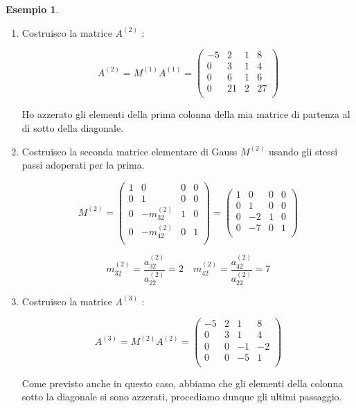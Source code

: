 \documentclass[12pt, a4paper]{book}
\theoremstyle{definition}
\newtheorem{exmp}{Esempio}[section]
\begin{document}
\begin{flushleft}
\begin{exmp}
\begin{enumerate}
	 \item Costruisco la matrice $A^{(2)}$ :
 
 	\[
 		A^{(2)} =  M^{(1)}A^{(1)} = 
 			\begin{pmatrix}
				-5 & 2 & 1 & 8 \\
				0 & 3 & 1 & 4 \\
				0 & 6 & 1 & 6 \\
				0 & 21 & 2 & 27 \\
			\end{pmatrix}
 	\]
 
 
 	Ho azzerato gli elementi della prima colonna della mia matrice di partenza al di sotto della diagonale.
 	
 	\item Costruisco la seconda matrice elementare di Gauss $M^{(2)}$ usando gli stessi passi adoperati per la prima.
 	
 	\[ 
 			M^{(2)} = 
				\begin{pmatrix}
					1 & 0 & 0 & 0 \\
					0 & 1 & 0 &0 \\
					0& -m^{(2)}_{32} & 1 & 0\\
					0 & -m^{(2)}_{42} & 0 & 1 \\
				\end{pmatrix}
				=
				\begin{pmatrix}
					1 & 0 & 0 & 0 \\
					0 & 1 & 0 &0 \\
					0& -2 & 1 & 0\\
					0 & -7 & 0 & 1 \\
				\end{pmatrix}
 	\]
 	
    \[ m^{(2)}_{32} = \frac{a^{(2)}_{32}}{a^{(2)}_{22}} = 2 \quad m^{(2)}_{42} = \frac{a^{(2)}_{42}}{a^{(2)}_{22}} = 7 \]
 	
 	\newpage
 	
 	\item Costruisco la matrice $A^{(3)}$ :
 	 
 	 	\[
 			A^{(3)} =  M^{(2)}A^{(2)} = 
 				\begin{pmatrix}
					-5 & 2 & 1 & 8 \\
					0 & 3 & 1 & 4 \\
					0 & 0 & -1 & -2 \\
					0 & 0 & -5 & 1 \\
				\end{pmatrix}
 		\]
 	 
 		Come previsto  anche in questo caso, abbiamo che gli elementi della colonna sotto la diagonale si sono azzerati, procediamo dunque gli ultimi passaggio.
 

\end{enumerate}
\end{exmp}
\end{flushleft}
\end{document}
